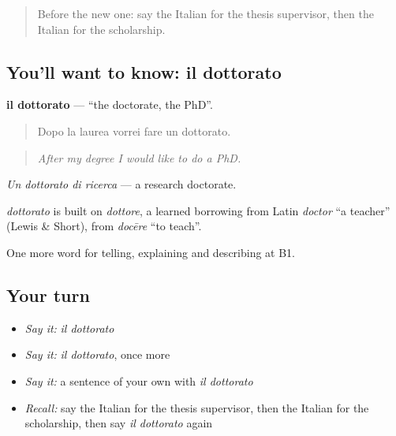 \label{lesson:IT-C381-dottorato}



\begin{quote}
Before the new one: say the Italian for the thesis supervisor, then the Italian for the scholarship.
\end{quote}

\subsection*{You'll want to know: il dottorato}
\textbf{il dottorato} — \textquotedblleft{}the doctorate, the PhD\textquotedblright{}.

\begin{quote}
Dopo la laurea vorrei fare un dottorato.
\end{quote}

\begin{quote}
\emph{After my degree I would like to do a PhD.}
\end{quote}

\emph{Un dottorato di ricerca} — a research doctorate.

\begin{cousinweb}
\emph{dottorato} is built on \emph{dottore}, a learned borrowing from Latin \emph{doctor} \textquotedblleft{}a teacher\textquotedblright{} (Lewis \& Short), from \emph{docēre} \textquotedblleft{}to teach\textquotedblright{}.
\end{cousinweb}

\begin{grammarlens}[title={What you've built}]
One more word for telling, explaining and describing at B1.
\end{grammarlens}

\subsection*{Your turn}
\begin{itemize}
\raggedright
  \item \emph{Say it:} \emph{il dottorato}
  \item \emph{Say it:} \emph{il dottorato}, once more
  \item \emph{Say it:} a sentence of your own with \emph{il dottorato}
  \item \emph{Recall:} say the Italian for the thesis supervisor, then the Italian for the scholarship, then say \emph{il dottorato} again
\end{itemize}

